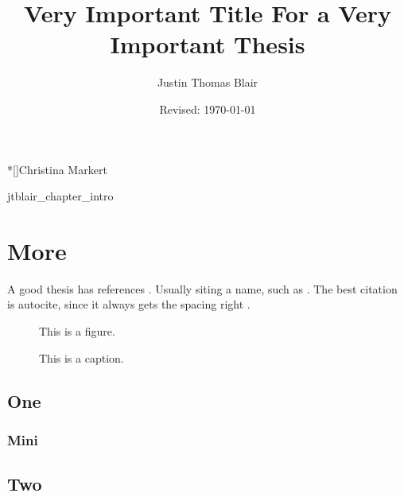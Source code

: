 \documentclass{utthesis}
\begin{document}
\author{Justin Thomas Blair} 
\title{Very Important Title For a Very Important Thesis} 
\date{Revised: \today}

\frontmatter

\UTcopyrightlegend %

\begin{UTcommittee}
\end{UTcommittee}


\setcounter{page}{4}



%
%

\begin{UTabstract}*[]{Christina Markert}
    
\end{UTabstract}


\tableofcontents

\listoffigures

\mainmatter

 {jtblair_chapter_intro}

\chapter{More}

A good thesis has references \cite{bib:somebook}. Usually siting a name, such as \textcite{bib:someart}. The best citation is autocite, since it always gets the spacing right \autocite{bib:somethesis}.

\lipsum[3]
\begin{figure}
This is a figure.
\caption[This]{This is a caption.}
\end{figure}
\section{One}
\subsection{Mini}
\section{Two}
\end{document}
